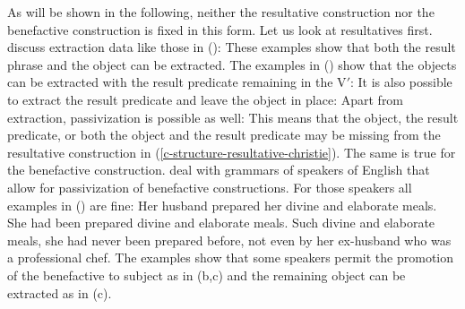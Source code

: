 As will be shown in the following, neither the resultative construction nor the benefactive
construction is fixed in this form. Let us look at resultatives first. \citet[]{CR92a} discuss
extraction data like those in ():
\eal\label{ex-resultative-just-verb-remains}
\zl
These examples show that both the result phrase and the object can be extracted. The examples in
() show that the objects can be extracted with the result predicate remaining in the V$'$:
\eal
{}
\zl
It is also possible to extract the result predicate and leave the object in place:
\eal
{}
\zl
Apart from extraction, passivization is possible as well:
\eal
{}
\zl
This means that the object, the result predicate, or both the object and the result predicate may be missing from the
resultative construction in (\ref{c-structure-resultative-christie}). The same is true for the
benefactive construction. \citet{AGT2014a} deal with grammars of speakers of English that allow for
passivization of benefactive constructions. For those speakers all examples in () are fine:
\eal
\label{ex-prepare-benefactive}
\ex Her husband prepared her divine and elaborate meals.
\ex
\label{ex-she-had-been-prepared-a-meal} 
She had been prepared divine and elaborate meals.
\ex
\label{ex-benefactive-just-verb} 
Such divine and elaborate meals, she had never been prepared before, not even
by her ex-husband who was a professional chef.
\zl
The examples show that some speakers permit the promotion of the benefactive to subject as in
(b,c) and the remaining object can be extracted as in (c). 


